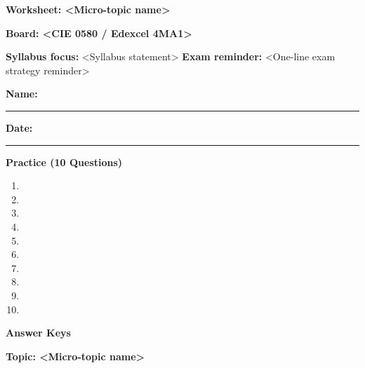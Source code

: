 \documentclass[11pt,a4paper]{article}
\newcommand{\Board}{<CIE 0580 / Edexcel 4MA1>}
\newcommand{\Topic}{<Micro-topic name>}
\newcommand{\SyllabusPoint}{<Syllabus statement>}
\begin{document}
{\Large\bfseries\color{BrandPrimary}Worksheet: \Topic}

\vspace{1mm}
{\small\bfseries Board: \Board}

\vspace{2mm}
{\small\textbf{Syllabus focus:} \SyllabusPoint}
\vspace{1mm}
{\small\textbf{Exam reminder:} <One-line exam strategy reminder>}

\vspace{3mm}
\noindent\textbf{Name:} \rule{0.38\linewidth}{0.3pt}\hfill\textbf{Date:} \rule{0.22\linewidth}{0.3pt}

\vspace{3mm}
\noindent\textbf{Practice (10 Questions)}

\begin{enumerate}
  \item <Question 1>
  \vspace{10mm}
  \item <Question 2>
  \vspace{10mm}
  \item <Question 3>
  \vspace{10mm}
  \item <Question 4>
  \vspace{10mm}
  \item <Question 5>
  \vspace{10mm}
  \item <Question 6>
  \vspace{10mm}
  \item <Question 7>
  \vspace{10mm}
  \item <Question 8>
  \vspace{10mm}
  \item <Question 9>
  \vspace{10mm}
  \item <Question 10>
\end{enumerate}

\newpage

{\Large\bfseries\color{BrandPrimary}Answer Keys}

\vspace{1mm}
{\small\bfseries Topic: \Topic}
\end{document}

